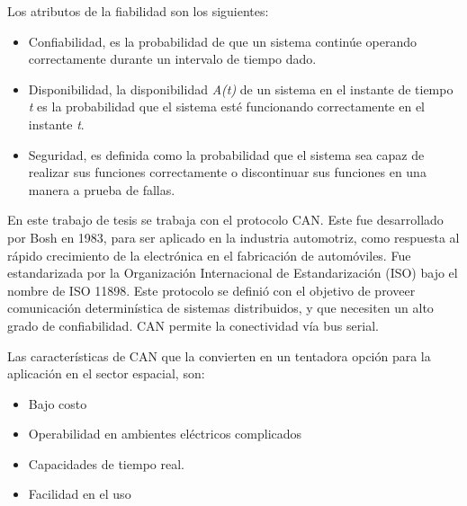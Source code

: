 Los atributos de la fiabilidad son los siguientes:
\begin{itemize}
\item Confiabilidad, es la probabilidad de que un sistema continúe operando correctamente
durante un intervalo de tiempo dado.
\item Disponibilidad, la disponibilidad \textit{A(t)} de un sistema en el
instante de tiempo \textit{t} es la probabilidad que el sistema esté funcionando correctamente en
el instante \textit{t}.
\item Seguridad, es definida como la probabilidad que el sistema sea capaz de realizar sus funciones correctamente o discontinuar sus funciones en una manera a prueba de fallas.
\end{itemize}

En este trabajo de tesis se trabaja con el protocolo CAN. Este fue desarrollado por Bosh en 1983, para ser aplicado en la industria automotriz, como respuesta al rápido crecimiento de la electrónica en el fabricación de automóviles. Fue estandarizada por la Organización Internacional de Estandarización (ISO) bajo el nombre de  ISO 11898. Este protocolo se definió con el objetivo de proveer comunicación determinística de sistemas distribuidos, y que necesiten un alto grado de confiabilidad. CAN permite la conectividad vía bus serial.

Las características de CAN que la convierten en un tentadora opción para la aplicación en el sector espacial, son:
\begin{itemize}
  \item Bajo costo
  \item Operabilidad en ambientes eléctricos complicados
  \item Capacidades de tiempo real.
  \item Facilidad en el uso
\end{itemize}
